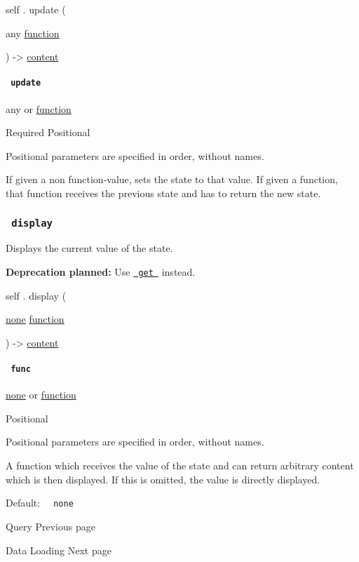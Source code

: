 self { . } { update } (

{ { any } \href{/docs/reference/foundations/function/}{function} }

) -\textgreater{} \href{/docs/reference/foundations/content/}{content}

\paragraph{\texorpdfstring{\texttt{\ update\ }}{ update }}\label{definitions-update-update}

{ any } {or} \href{/docs/reference/foundations/function/}{function}

{Required} {{ Positional }}

\label{definitions-update-update-positional-tooltip}
Positional parameters are specified in order, without names.

If given a non function-value, sets the state to that value. If given a
function, that function receives the previous state and has to return
the new state.

\subsubsection{\texorpdfstring{\texttt{\ display\ }}{ display }}\label{definitions-display}

Displays the current value of the state.

\textbf{Deprecation planned:} Use
\href{/docs/reference/introspection/state/\#definitions-get}{\texttt{\ get\ }}
instead.

self { . } { display } (

{ \href{/docs/reference/foundations/none/}{none}
\href{/docs/reference/foundations/function/}{function} }

) -\textgreater{} \href{/docs/reference/foundations/content/}{content}

\paragraph{\texorpdfstring{\texttt{\ func\ }}{ func }}\label{definitions-display-func}

\href{/docs/reference/foundations/none/}{none} {or}
\href{/docs/reference/foundations/function/}{function}

{{ Positional }}

\label{definitions-display-func-positional-tooltip}
Positional parameters are specified in order, without names.

A function which receives the value of the state and can return
arbitrary content which is then displayed. If this is omitted, the value
is directly displayed.

Default: \texttt{\ }{\texttt{\ none\ }}\texttt{\ }

\href{/docs/reference/introspection/query/}{\pandocbounded{}}

{ Query } { Previous page }

\href{/docs/reference/data-loading/}{\pandocbounded{}}

{ Data Loading } { Next page }
